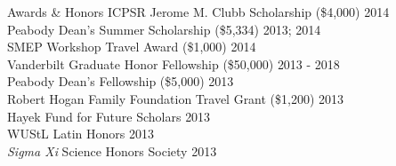 \documentclass {resume}
\begin{document}
\begin{rSection}{\textrm{Awards \& Honors}}
ICPSR Jerome M. Clubb Scholarship (\$4,000) \hfill{2014}\smallskip\\
Peabody Dean's Summer Scholarship (\$5,334)			    \hfill  {2013; 2014}\smallskip\\	
SMEP Workshop Travel Award (\$1,000) \hfill{2014}\smallskip\\
Vanderbilt Graduate Honor Fellowship (\$50,000)	\hfill  {2013 - 2018}\smallskip\\	
Peabody Dean's Fellowship (\$5,000)					\hfill  {2013}\smallskip\\
Robert Hogan Family Foundation Travel Grant (\$1,200) 	\hfill  {2013}\smallskip\\
Hayek Fund for Future Scholars                      \hfill  {2013}\smallskip\\
WUStL Latin Honors \hfill  {2013}\smallskip\\
\textit{Sigma Xi} Science Honors Society                    			\hfill  {2013}%
\end{rSection}
\end{document}
